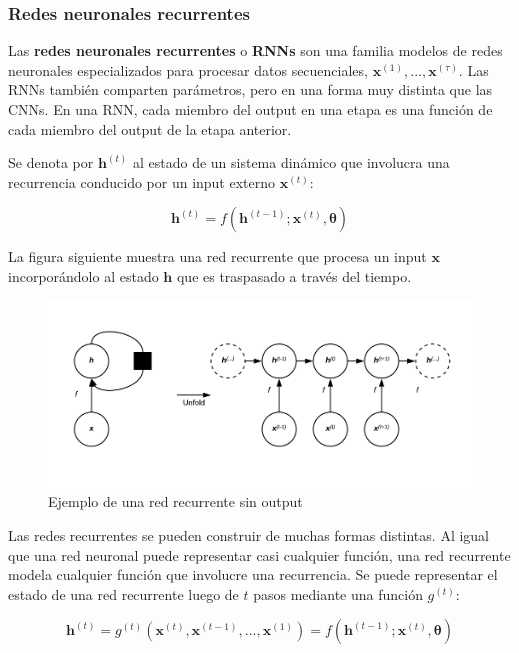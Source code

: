 \subsubsection{Redes neuronales recurrentes}

Las \textbf{redes neuronales recurrentes} o \textbf{RNNs} son una familia modelos de redes neuronales especializados para procesar datos secuenciales, $\bm{x}^{(1)},...,\bm{x}^{(\tau)}$. Las RNNs tambi\'en comparten par\'ametros, pero en una forma muy distinta que las CNNs. En una RNN, cada miembro del output en una etapa es una funci\'on de cada miembro del output de la etapa anterior.

Se denota por $\bm{h}^{(t)}$ al estado de un sistema din\'amico que involucra una recurrencia conducido por un input externo $\bm{x}^{(t)}$:

\begin{equation}
\bm{h}^{(t)} = f(\bm{h}^{(t-1)}; \bm{x}^{(t)}, \bm{\theta})
\end{equation}

La figura siguiente muestra una red recurrente que procesa un input $\bm{x}$ incorpor\'andolo al estado $\bm{h}$ que es traspasado a trav\'es del tiempo.

\begin{figure}[H]
\captionsetup{font=small,labelfont=small}
\caption{Ejemplo de una red recurrente sin output}
\centering
\includegraphics[scale=.5]{img/cap7_RNN1.png}
\end{figure}

Las redes recurrentes se pueden construir de muchas formas distintas. Al igual que una red neuronal puede representar casi cualquier funci\'on, una red recurrente modela cualquier funci\'on que involucre una recurrencia. Se puede representar el estado de una red recurrente luego de $t$ pasos mediante una funci\'on $g^{(t)}$:

\begin{equation}
\bm{h}^{(t)} = g^{(t)}(\bm{x}^{(t)},\bm{x}^{(t-1)},...,\bm{x}^{(1)}) =  f(\bm{h}^{(t-1)}; \bm{x}^{(t)}, \bm{\theta})
\end{equation}

